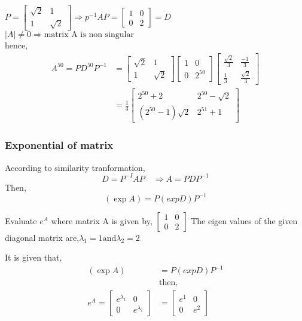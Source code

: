 \begin{answer}
	$P=\left[ \begin{array}{cc}
		\sqrt{2}& 1\\
		1& \sqrt{2} 
	\end{array}\right]\Longrightarrow p^{-1}AP=\left[ \begin{array}{cc}
		1& 0\\
		0& 2 
	\end{array}\right]=D$\\
	$|A|\neq 0\Longrightarrow\text{matrix A is non singular}$\\
	hence, $$
	\begin{aligned}
		A^{50}=PD^{50}P^{-1}&=\left[ \begin{array}{cc}
			\sqrt{2}& 1\\
			1& \sqrt{2} 
		\end{array}\right] \left[ \begin{array}{cc}
			1& 0\\
			0& 2^{50} 
		\end{array}\right] \left[ \begin{array}{cc}
			\frac{\sqrt{2}}{3}& \frac{-1}{3}\\
			\frac{{1}}{3}& \frac{\sqrt{2}}{3} 
		\end{array}\right]
		\\&=\frac{1}{3} \left[ \begin{array}{cc}
			2^{50}+2& 2^{50}-{\sqrt{2}}\\
			(2^{50}-1)\sqrt{2}& 2^{51}+1 
		\end{array}\right]
	\end{aligned}$$
	
	
\end{answer}

\subsubsection{Exponential of matrix}
According to similarity tranformation, $$D=P^{-I} A P \quad \Rightarrow A=P D P^{-1}$$Then,
$$(\exp A)=P(e x p D) P^{-1}$$
\begin{exercise}
	Evaluate $ e^{A}$ where matrix A is given by, $\left[ \begin{array}{cc}
		1& 0\\
		0& 2 
	\end{array}\right] $
The eigen values of the given diagonal matrix are,$ \lambda_{1}=1  \text{and}  \lambda_{2}=2$
\end{exercise}
\begin{answer}
It is given that,
$$ \begin{aligned}
	(\exp A)&=P(e x p D) P^{-1} \\
	&\text{then,}\\
	e^{A}=\left[ \begin{array}{cc}
		e^{\lambda_{1}}& 0\\
		0& e^{\lambda_{2}}
	\end{array}\right]&=\left[ \begin{array}{cc}
	e^{1}& 0\\
	0& e^{2}
\end{array}\right]
\end{aligned}$$
\end{answer}
